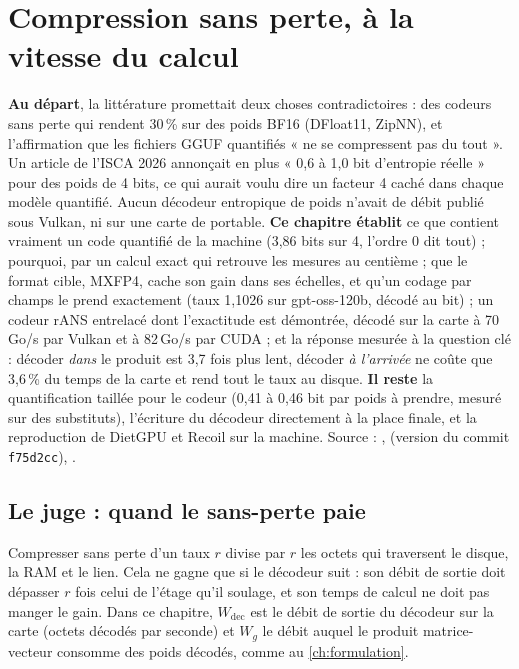 \chapter{Compression sans perte, à la vitesse du calcul}\label{ch:entropie}

\begin{origine}
\textbf{Au départ}, la littérature promettait deux choses contradictoires : des codeurs sans perte qui rendent 30\,\% sur des poids BF16 (DFloat11, ZipNN), et l'affirmation que les fichiers GGUF quantifiés « ne se compressent pas du tout ». Un article de l'ISCA 2026 annonçait en plus « 0,6 à 1,0 bit d'entropie réelle » pour des poids de 4 bits, ce qui aurait voulu dire un facteur 4 caché dans chaque modèle quantifié. Aucun décodeur entropique de poids n'avait de débit publié sous Vulkan, ni sur une carte de portable.
\textbf{Ce chapitre établit} ce que contient vraiment un code quantifié de la machine (3,86 bits sur 4, l'ordre 0 dit tout) ; pourquoi, par un calcul exact qui retrouve les mesures au centième ; que le format cible, MXFP4, cache son gain dans ses échelles, et qu'un codage par champs le prend exactement (taux 1,1026 sur gpt-oss-120b, décodé au bit) ; un codeur rANS entrelacé dont l'exactitude est démontrée, décodé sur la carte à 70\,Go/s par Vulkan et à 82\,Go/s par CUDA ; et la réponse mesurée à la question clé : décoder \emph{dans} le produit est 3,7 fois plus lent, décoder \emph{à l'arrivée} ne coûte que 3,6\,\% du temps de la carte et rend tout le taux au disque.
\textbf{Il reste} la quantification taillée pour le codeur (0,41 à 0,46 bit par poids à prendre, mesuré sur des substituts), l'écriture du décodeur directement à la place finale, et la reproduction de DietGPU et Recoil sur la machine.
Source : ,  (version du commit \texttt{f75d2cc}), .
\end{origine}

\section{Le juge : quand le sans-perte paie}\label{sec:ent-juge}

Compresser sans perte d'un taux $r$ divise par $r$ les octets qui traversent le disque, la RAM et le lien. Cela ne gagne que si le décodeur suit : son débit de sortie doit dépasser $r$ fois celui de l'étage qu'il soulage, et son temps de calcul ne doit pas manger le gain. Dans ce chapitre, $W_{\mathrm{dec}}$ est le débit de sortie du décodeur sur la carte (octets décodés par seconde) et $W_g$ le débit auquel le produit matrice-vecteur consomme des poids décodés, comme au \cref{ch:formulation}.

